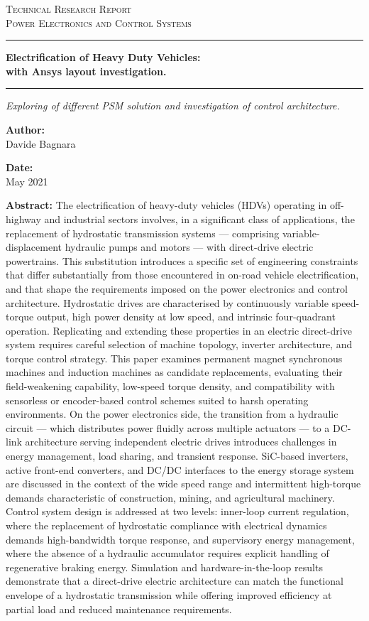 \documentclass[11pt,a4paper,oneside]{book}
\newcommand{\DocCategory}{Technical Research Report}
\newcommand{\DocField}{Power Electronics and Control Systems}
\newcommand{\DocTitle}{%
	{\fontsize{20}{24}\selectfont\bfseries Electrification of Heavy Duty Vehicles:} \\[16pt]
	{\fontsize{16}{20}\selectfont\bfseries with Ansys layout investigation.}
}
\newcommand{\DocSubtitle}{%
	Exploring of different PSM solution and investigation of control architecture.
}
\newcommand{\DocAuthor}{Davide Bagnara}
\newcommand{\DocDate}{May 2021}
\newcommand{\DocAbstract}{%
	The electrification of heavy-duty vehicles (HDVs) operating in off-highway and industrial sectors involves, in a significant class of applications, the replacement of hydrostatic transmission systems — comprising variable-displacement hydraulic pumps and motors — with direct-drive electric powertrains. This substitution introduces a specific set of engineering constraints that differ substantially from those encountered in on-road vehicle electrification, and that shape the requirements imposed on the power electronics and control architecture.
	Hydrostatic drives are characterised by continuously variable speed-torque output, high power density at low speed, and intrinsic four-quadrant operation. Replicating and extending these properties in an electric direct-drive system requires careful selection of machine topology, inverter architecture, and torque control strategy. This paper examines permanent magnet synchronous machines and induction machines as candidate replacements, evaluating their field-weakening capability, low-speed torque density, and compatibility with sensorless or encoder-based control schemes suited to harsh operating environments.
	On the power electronics side, the transition from a hydraulic circuit — which distributes power fluidly across multiple actuators — to a DC-link architecture serving independent electric drives introduces challenges in energy management, load sharing, and transient response. SiC-based inverters, active front-end converters, and DC/DC interfaces to the energy storage system are discussed in the context of the wide speed range and intermittent high-torque demands characteristic of construction, mining, and agricultural machinery.
	Control system design is addressed at two levels: inner-loop current regulation, where the replacement of hydrostatic compliance with electrical dynamics demands high-bandwidth torque response, and supervisory energy management, where the absence of a hydraulic accumulator requires explicit handling of regenerative braking energy. Simulation and hardware-in-the-loop results demonstrate that a direct-drive electric architecture can match the functional envelope of a hydrostatic transmission while offering improved efficiency at partial load and reduced maintenance requirements.
}
\begin{document}
	\titlepage
	\begin{center}
		{\Large\scshape \DocCategory}\\[8pt]
		{\large\scshape \DocField}
	\end{center}
	
	\vspace{18pt}
	\noindent\rule{\linewidth}{0.8pt}
	
	\begin{center}
		\DocTitle
	\end{center}
	
	\vspace{4pt}
	\noindent\rule{\linewidth}{2.2pt}
	
	\begin{center}
		\begin{onehalfspace}
			{\large\itshape \DocSubtitle}
		\end{onehalfspace}
	\end{center}
	
	\vspace{18pt}
	
	\begin{minipage}{0.92\linewidth}
		\noindent
		\begin{minipage}[t]{0.48\linewidth}
			\textbf{Author:}\\[2pt]
			\DocAuthor
		\end{minipage}%
		\hfill
		\begin{minipage}[t]{0.48\linewidth}
			\raggedleft
			\textbf{Date:}\\[2pt]
			\DocDate
		\end{minipage}
	\end{minipage}
	\vspace{18pt}
	
	\begin{center}
		\begin{minipage}{0.85\linewidth}
			\footnotesize 
			\begin{onehalfspace}
				\textbf{Abstract:} \DocAbstract
			\end{onehalfspace}
		\end{minipage}
	\end{center}
	
\end{document}
